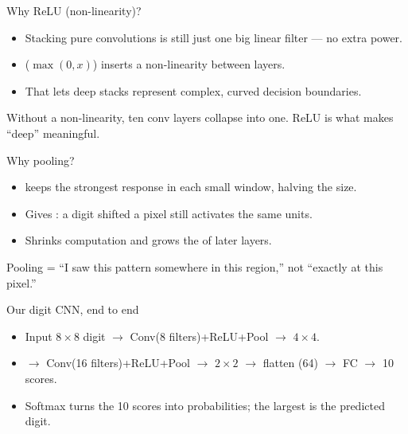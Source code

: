 \documentclass[10pt,aspectratio=169]{beamer}
\begin{document}
\begin{frame}{Why ReLU (non-linearity)?}
  \begin{itemize}
    \item Stacking pure convolutions is still just one big linear filter — no extra power.
    \item {} ($\max(0,x)$) inserts a non-linearity between layers.
    \item That lets deep stacks represent complex, curved decision boundaries.
  \end{itemize}
  \begin{mathbox}
    Without a non-linearity, ten conv layers collapse into one. ReLU is what makes ``deep'' meaningful.
  \end{mathbox}
\end{frame}

\begin{frame}{Why pooling?}
  \begin{itemize}
    \item {} keeps the strongest response in each small window, halving the size.
    \item Gives : a digit shifted a pixel still activates the same units.
    \item Shrinks computation and grows the  of later layers.
  \end{itemize}
  \begin{goodbox}
    Pooling = ``I saw this pattern somewhere in this region,'' not ``exactly at this pixel.''
  \end{goodbox}
\end{frame}

\begin{frame}{Our digit CNN, end to end}
  \begin{itemize}
    \item Input $8\times8$ digit $\rightarrow$ Conv(8 filters)+ReLU+Pool $\rightarrow$ $4\times4$.
    \item $\rightarrow$ Conv(16 filters)+ReLU+Pool $\rightarrow$ $2\times2$ $\rightarrow$ flatten (64) $\rightarrow$ FC $\rightarrow$ 10 scores.
    \item Softmax turns the 10 scores into probabilities; the largest is the predicted digit.
  \end{itemize}
\end{frame}
\end{document}
